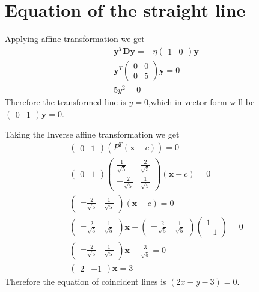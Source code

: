\documentclass[journal,12pt,twocolumn]{IEEEtran}
\providecommand{\brak}[1]{\ensuremath{\left(#1\right)}}
\newcommand{\myvec}[1]{\ensuremath{\begin{pmatrix}#1\end{pmatrix}}}
\numberwithin{equation}{subsection}
\let\vec\mathbf
\begin{document}
\section{Equation of the straight line}
Applying affine transformation we get
\begin{align}
    \vec{y}^T\vec{D}\vec{y}=-\eta\myvec{1&0}\vec{y}\\
    \vec{y}^T\myvec{0&0\\0&5}\vec{y}=0\\
    5y^2=0
\end{align}
Therefore the transformed line is $y=0$,which in vector form will be $\myvec{0&1}\vec{y}=0$.\par
Taking the Inverse affine transformation we get
\begin{align}
    \myvec{0&1}\brak{P^T\brak{\vec{x}-c}}=0\\
    \myvec{0&1}\myvec{\frac{1}{\sqrt{5}}&\frac{2}{\sqrt{5}}\\-\frac{2}{\sqrt{5}}&\frac{1}{\sqrt{5}}}\brak{\vec{x}-c}=0\\
    \myvec{-\frac{2}{\sqrt{5}}&\frac{1}{\sqrt{5}}}\brak{\vec{x}-c}=0\\
    \myvec{-\frac{2}{\sqrt{5}}&\frac{1}{\sqrt{5}}}\vec{x}-\myvec{-\frac{2}{\sqrt{5}}&\frac{1}{\sqrt{5}}}\myvec{1\\-1}=0\\
    \myvec{-\frac{2}{\sqrt{5}}&\frac{1}{\sqrt{5}}}\vec{x}+\frac{3}{\sqrt{5}}=0\\
    \myvec{2&-1}\vec{x}=3
\end{align}
Therefore the equation of coincident lines is $\brak{2x-y-3}=0$.
\end{document}
